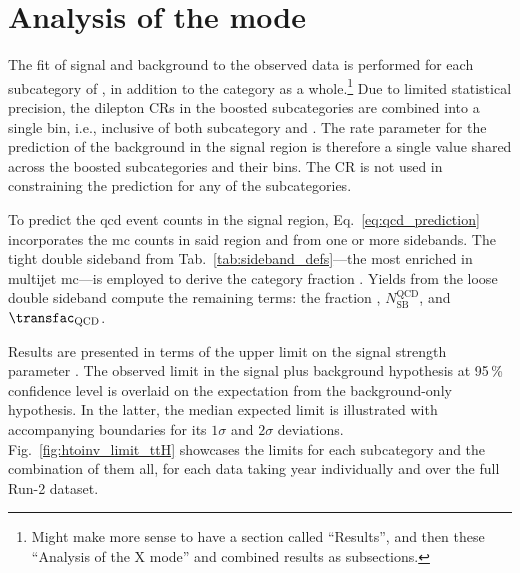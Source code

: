 \section{Analysis of the \texorpdfstring{\ttH}{ttH} mode}
\label{sec:htoinv_analysis_ttH}

The fit of signal and background to the observed data is performed for each subcategory of \ttH, in addition to the category as a whole.\footnote{Might make more sense to have a section called ``Results'', and then these ``Analysis of the X mode'' and combined results as subsections.} Due to limited statistical precision, the dilepton \glspl{CR} in the boosted subcategories are combined into a single bin, i.e., inclusive of both subcategory and \ptmiss. The rate parameter for the prediction of the \ztonunu background in the signal region is therefore a single value shared across the boosted subcategories and their \ptmiss bins. The \singlePhotonCr \gls{CR} is not used in constraining the \ztonunu prediction for any of the subcategories.

To predict the \acrshort{qcd} event counts in the signal region, Eq.~\ref{eq:qcd_prediction} incorporates the \acrshort{mc} counts in said region and from one or more sidebands. The tight double sideband from Tab.~\ref{tab:sideband_defs}---the most enriched in multijet \acrshort{mc}---is employed to derive the category fraction \catFraction. Yields from the loose double sideband compute the remaining terms: the \ptmiss fraction \metFraction, $N_{\mathrm{SB}}^{\mathrm{QCD}}$, and $\transfac_{\mathrm{QCD}}$.

Results are presented in terms of the upper limit on the signal strength parameter \BRHinvFull. The observed limit in the signal plus background hypothesis at 95\,\% confidence level is overlaid on the expectation from the background-only hypothesis. In the latter, the median expected limit is illustrated with accompanying boundaries for its $\text{1}\sigma$ and $\text{2}\sigma$ deviations. Fig.~\ref{fig:htoinv_limit_ttH} showcases the limits for each \ttH subcategory and the combination of them all, for each data taking year individually and over the full Run-2 dataset.

